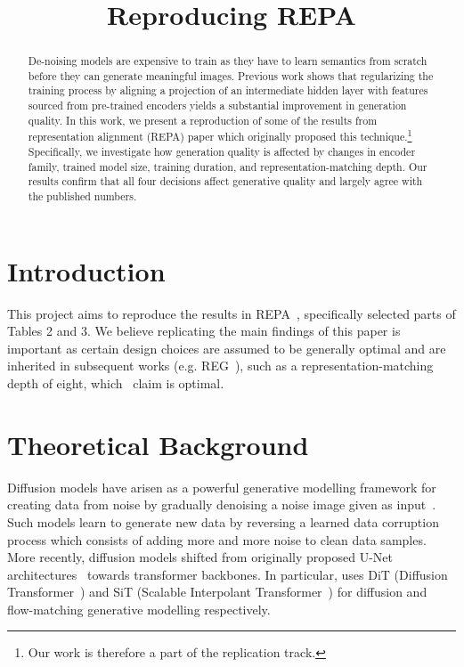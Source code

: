\documentclass{article}
\title{Reproducing REPA}
\begin{document}
\maketitle

\begin{abstract} 
De-noising models are expensive to train as they have to learn semantics from scratch before they can generate meaningful images. Previous work shows that regularizing the training process by aligning a projection of an intermediate hidden layer with features sourced from pre-trained encoders yields a substantial improvement in generation quality. In this work, we present a reproduction of some of the results from representation alignment (REPA) paper which originally proposed this technique.\footnote{Our work is therefore a part of the replication track.} Specifically, we investigate how generation quality is affected by changes in encoder family, trained model size, training duration, and representation-matching depth. Our results confirm that all four decisions affect generative quality and largely agree with the published numbers. 

\end{abstract}

\section{Introduction}
This project aims to reproduce the results in REPA~\cite{yu2025repa}, specifically selected parts of Tables 2 and 3. We believe replicating the main findings of this paper is important as certain design choices are assumed to be generally optimal and are inherited in subsequent works (e.g. REG~\cite{wu2025representationentanglementgenerationtraining}), such as a representation-matching depth of eight, which~\cite{yu2025repa} claim is optimal.  


\section{Theoretical Background}\label{sec:theory}

Diffusion models have arisen as a powerful generative modelling framework for creating data from noise by gradually denoising a noise image given as input~\cite{ho2020ddpm}. Such models learn to generate new data by reversing a learned data corruption process which consists of adding more and more noise to clean data samples. More recently, diffusion models shifted from originally proposed U-Net architectures~\cite{ronneberger2015unet} towards transformer backbones. In particular, \cite{yu2025repa} uses DiT (Diffusion Transformer~\cite{peebles2023dit}) and SiT (Scalable Interpolant Transformer~\cite{sit}) for diffusion and flow-matching generative modelling respectively.
\end{document}
